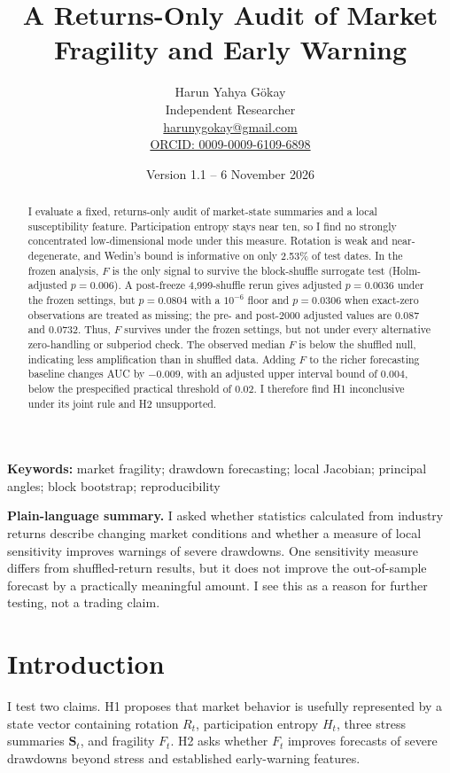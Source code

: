 \documentclass[11pt]{article}
\title{A Returns-Only Audit of Market Fragility and Early Warning}
\author{Harun Yahya G\"okay\\Independent Researcher\\\href{mailto:harunygokay@gmail.com}{harunygokay@gmail.com}\\\href{https://orcid.org/0009-0009-6109-6898}{ORCID: 0009-0009-6109-6898}}
\date{Version 1.1 -- 6 November 2026}
\begin{document}
\maketitle

\begin{abstract}
I evaluate a fixed, returns-only audit of market-state summaries and a local susceptibility feature. Participation entropy stays near ten, so I find no strongly concentrated low-dimensional mode under this measure. Rotation is weak and near-degenerate, and Wedin's bound is informative on only 2.53\% of test dates. In the frozen analysis, $F$ is the only signal to survive the block-shuffle surrogate test (Holm-adjusted $p=0.006$). A post-freeze 4,999-shuffle rerun gives adjusted $p=0.0036$ under the frozen settings, but $p=0.0804$ with a $10^{-6}$ floor and $p=0.0306$ when exact-zero observations are treated as missing; the pre- and post-2000 adjusted values are $0.087$ and $0.0732$. Thus, $F$ survives under the frozen settings, but not under every alternative zero-handling or subperiod check. The observed median $F$ is below the shuffled null, indicating less amplification than in shuffled data. Adding $F$ to the richer forecasting baseline changes AUC by $-0.009$, with an adjusted upper interval bound of $0.004$, below the prespecified practical threshold of $0.02$. I therefore find H1 inconclusive under its joint rule and H2 unsupported.
\end{abstract}

\noindent\textbf{Keywords:} market fragility; drawdown forecasting; local Jacobian; principal angles; block bootstrap; reproducibility

\noindent\textbf{Plain-language summary.} I asked whether statistics calculated from industry returns describe changing market conditions and whether a measure of local sensitivity improves warnings of severe drawdowns. One sensitivity measure differs from shuffled-return results, but it does not improve the out-of-sample forecast by a practically meaningful amount. I see this as a reason for further testing, not a trading claim.

\section{Introduction}
I test two claims. H1 proposes that market behavior is usefully represented by a state vector containing rotation $R_t$, participation entropy $H_t$, three stress summaries $\mathbf S_t$, and fragility $F_t$. H2 asks whether $F_t$ improves forecasts of severe drawdowns beyond stress and established early-warning features.
\end{document}

